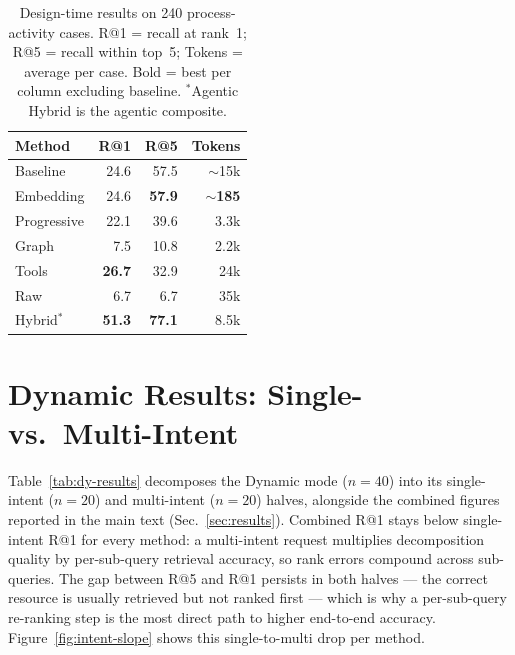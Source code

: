 \begin{table}[h]
  \renewcommand{\arraystretch}{1.15}
  \setlength{\tabcolsep}{4pt}
  \caption{Design-time results on 240 process-activity cases. R@1 = recall at rank~1; R@5 = recall within top~5; Tokens = average per case. Bold = best per column excluding baseline. $^{*}$Agentic Hybrid is the agentic composite.}
  \label{tab:full-results-dt}
  \centering\footnotesize
  \begin{tabular}{@{} l r r r @{}}
  \toprule
  \textbf{Method} & \textbf{R@1} & \textbf{R@5} & \textbf{Tokens} \\
  \midrule
  Baseline & 24.6 & 57.5 & $\sim$15k \\
  \midrule
  Embedding & 24.6 & \textbf{57.9} & \textbf{$\sim$185} \\
  Progressive & 22.1 & 39.6 & 3.3k \\
  Graph & 7.5  & 10.8 & 2.2k \\
  Tools & \textbf{26.7} & 32.9 & 24k \\
  Raw & 6.7  & 6.7  & 35k \\
  \midrule
  Hybrid$^{*}$ & \textbf{51.3} & \textbf{77.1} & 8.5k \\
  \bottomrule
  \end{tabular}
\end{table}


\section{Dynamic Results: Single- vs.\ Multi-Intent}
\label{appendix:dy-breakdown}

Table~\ref{tab:dy-results} decomposes the Dynamic mode ($n{=}40$) into its single-intent ($n{=}20$) and multi-intent ($n{=}20$) halves, alongside the combined figures reported in the main text (Sec.~\ref{sec:results}). Combined R@1 stays below single-intent R@1 for every method: a multi-intent request multiplies decomposition quality by per-sub-query retrieval accuracy, so rank errors compound across sub-queries. The gap between R@5 and R@1 persists in both halves --- the correct resource is usually retrieved but not ranked first --- which is why a per-sub-query re-ranking step is the most direct path to higher end-to-end accuracy. Figure~\ref{fig:intent-slope} shows this single-to-multi drop per method.

